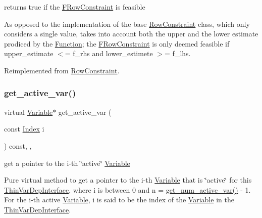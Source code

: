 returns true if the \mbox{\hyperlink{class_s_m_spp__di__unipi__it_1_1_f_row_constraint}{F\+Row\+Constraint}} is feasible 

As opposed to the implementation of the base \mbox{\hyperlink{class_s_m_spp__di__unipi__it_1_1_row_constraint}{Row\+Constraint}} class, which only considers a single value, takes into account both the upper and the lower estimate prodiced by the \mbox{\hyperlink{class_s_m_spp__di__unipi__it_1_1_function}{Function}}; the \mbox{\hyperlink{class_s_m_spp__di__unipi__it_1_1_f_row_constraint}{F\+Row\+Constraint}} is only deemed feasible if upper\+\_\+estimate $<$= f\+\_\+rhs and lower\+\_\+estimete $>$= f\+\_\+lhs. 

Reimplemented from \mbox{\hyperlink{class_s_m_spp__di__unipi__it_1_1_row_constraint_a508a569b1ce65668a4bbe261b0e2efab}{Row\+Constraint}}.

\mbox{\label{class_s_m_spp__di__unipi__it_1_1_f_row_constraint_a8599e4f65a8e9750fa7020ff2f50161f}} 
\subsubsection{\texorpdfstring{get\+\_\+active\+\_\+var()}{get\_active\_var()}}
{\footnotesize\ttfamily virtual \mbox{\hyperlink{class_s_m_spp__di__unipi__it_1_1_variable}{Variable}}$\ast$ get\+\_\+active\+\_\+var (\begin{DoxyParamCaption}\item[{const \mbox{\hyperlink{group___thin_var_dep_interface___c_l_a_s_s_e_s_gad53d6229d7ec28555a9c9c2fd9abf773}{Index}}}]{i }\end{DoxyParamCaption}) const\hspace{0.3cm}{\ttfamily [inline]}, {\ttfamily [override]}, {\ttfamily [virtual]}}



get a pointer to the i-\/th \char`\"{}active\char`\"{} \mbox{\hyperlink{class_s_m_spp__di__unipi__it_1_1_variable}{Variable}} 

Pure virtual method to get a pointer to the i-\/th \mbox{\hyperlink{class_s_m_spp__di__unipi__it_1_1_variable}{Variable}} that is \char`\"{}active\char`\"{} for this \mbox{\hyperlink{class_s_m_spp__di__unipi__it_1_1_thin_var_dep_interface}{Thin\+Var\+Dep\+Interface}}, where i is between 0 and n = \mbox{\hyperlink{class_s_m_spp__di__unipi__it_1_1_f_row_constraint_acc8ac3c57cc2c71ac3fe6c409fe53074}{get\+\_\+num\+\_\+active\+\_\+var()}} -\/ 1. For the i-\/th active \mbox{\hyperlink{class_s_m_spp__di__unipi__it_1_1_variable}{Variable}}, i is said to be the index of the \mbox{\hyperlink{class_s_m_spp__di__unipi__it_1_1_variable}{Variable}} in the \mbox{\hyperlink{class_s_m_spp__di__unipi__it_1_1_thin_var_dep_interface}{Thin\+Var\+Dep\+Interface}}.

